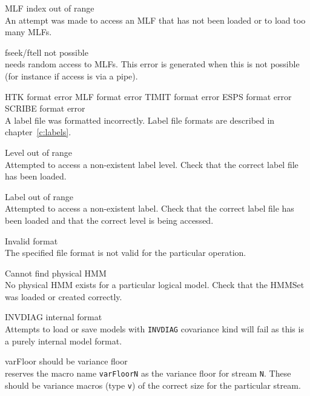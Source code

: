 \begin{itemize}
\begin{itemize}
\end{itemize}


\begin{itemize}
    MLF index out of range\\
        An attempt was made to access an MLF that has not been loaded or to 
        load too many MLFs.

    fseek/ftell not possible\\
         needs random access to MLFs.  This error is generated
        when this is not possible (for instance if access is via a pipe).

    HTK format error
    MLF format error
    TIMIT format error
 ESPS format error
    SCRIBE format error\\
        A label file was formatted incorrectly.  Label
        file formats are described in chapter~\ref{c:labels}.

    Level out of range\\
        Attempted to access a non-existent label level.  Check that the correct
        label file has been loaded.

    Label out of range\\
        Attempted to access a non-existent label.  Check that the correct
        label file has been loaded and that the correct level is being 
        accessed.

    Invalid format\\
        The specified file format is not valid for the particular operation.

\end{itemize}


\begin{itemize}
    Cannot find physical HMM\\
        No physical HMM exists for a particular logical model.  Check that the
        HMMSet was loaded or created correctly.

    INVDIAG internal format\\
        Attempts to load or save models with \texttt{INVDIAG} covariance kind
        will fail as this is a purely internal model format.

 varFloor should be variance floor\\
         reserves the macro name \texttt{varFloorN} as the 
        variance floor for stream \texttt{N}.  These should be variance 
        macros (type \texttt{v}) of the correct size for the particular stream.


\end{itemize}
\end{itemize}
